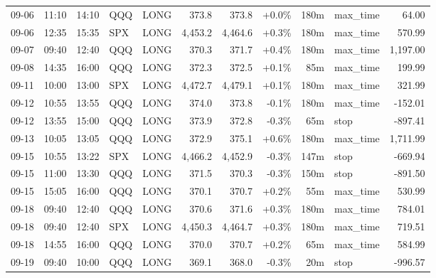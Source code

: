 \documentclass[11pt,a4paper,twoside]{article}
\begin{document}
\begin{center}
\begin{longtable}{>{\color{txtmain}}l l l l l r r r r >{\color{txtmain}}l r}
09-06 & 11:10 & 14:10 & QQQ & LONG & 373.8 & 373.8 & \textcolor{wingreen}{+0.0\%} & 180m & max\_time & \textcolor{wingreen}{64.00} \\
09-06 & 12:35 & 15:35 & SPX & LONG & 4,453.2 & 4,464.6 & \textcolor{wingreen}{+0.3\%} & 180m & max\_time & \textcolor{wingreen}{570.99} \\
09-07 & 09:40 & 12:40 & QQQ & LONG & 370.3 & 371.7 & \textcolor{wingreen}{+0.4\%} & 180m & max\_time & \textcolor{wingreen}{1,197.00} \\
09-08 & 14:35 & 16:00 & QQQ & LONG & 372.3 & 372.5 & \textcolor{wingreen}{+0.1\%} & 85m & max\_time & \textcolor{wingreen}{199.99} \\
09-11 & 10:00 & 13:00 & SPX & LONG & 4,472.7 & 4,479.1 & \textcolor{wingreen}{+0.1\%} & 180m & max\_time & \textcolor{wingreen}{321.99} \\
09-12 & 10:55 & 13:55 & QQQ & LONG & 374.0 & 373.8 & \textcolor{lossred}{-0.1\%} & 180m & max\_time & \textcolor{lossred}{-152.01} \\
09-12 & 13:55 & 15:00 & QQQ & LONG & 373.9 & 372.8 & \textcolor{lossred}{-0.3\%} & 65m & stop & \textcolor{lossred}{-897.41} \\
09-13 & 10:05 & 13:05 & QQQ & LONG & 372.9 & 375.1 & \textcolor{wingreen}{+0.6\%} & 180m & max\_time & \textcolor{wingreen}{1,711.99} \\
09-15 & 10:55 & 13:22 & SPX & LONG & 4,466.2 & 4,452.9 & \textcolor{lossred}{-0.3\%} & 147m & stop & \textcolor{lossred}{-669.94} \\
09-15 & 11:00 & 13:30 & QQQ & LONG & 371.5 & 370.3 & \textcolor{lossred}{-0.3\%} & 150m & stop & \textcolor{lossred}{-891.50} \\
09-15 & 15:05 & 16:00 & QQQ & LONG & 370.1 & 370.7 & \textcolor{wingreen}{+0.2\%} & 55m & max\_time & \textcolor{wingreen}{530.99} \\
09-18 & 09:40 & 12:40 & QQQ & LONG & 370.6 & 371.6 & \textcolor{wingreen}{+0.3\%} & 180m & max\_time & \textcolor{wingreen}{784.01} \\
09-18 & 09:40 & 12:40 & SPX & LONG & 4,450.3 & 4,464.7 & \textcolor{wingreen}{+0.3\%} & 180m & max\_time & \textcolor{wingreen}{719.51} \\
09-18 & 14:55 & 16:00 & QQQ & LONG & 370.0 & 370.7 & \textcolor{wingreen}{+0.2\%} & 65m & max\_time & \textcolor{wingreen}{584.99} \\
09-19 & 09:40 & 10:00 & QQQ & LONG & 369.1 & 368.0 & \textcolor{lossred}{-0.3\%} & 20m & stop & \textcolor{lossred}{-996.57} \\

\end{longtable}
\end{center}
\end{document}
